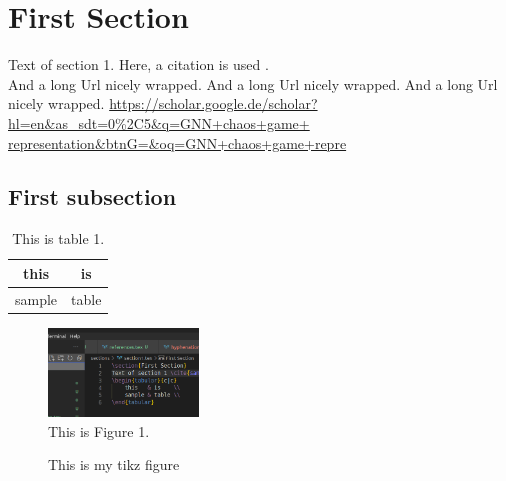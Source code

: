 \section{First Section}

Text of section 1. Here, a citation is used \cite{sample, onlineRef}.\\
And a long Url nicely wrapped. And a long Url nicely wrapped. And a long Url nicely wrapped.
\url{https://scholar.google.de/scholar?hl=en&as_sdt=0\%2C5&q=GNN+chaos+game+
representation&btnG=&oq=GNN+chaos+game+repre}

\subsection{First subsection}

\begin{table}
    \center
    \begin{tabular}{c|c}
        this   & is    \\\hline
        sample & table \\
    \end{tabular}
    \caption{This is table 1.}
\end{table}

\begin{figure}
    \center
    \includegraphics[width=4cm]{fig/images/figure_01.png}
    \caption{This is Figure 1.}
\end{figure}

\begin{figure}
    \center
    
    \caption{This is my tikz figure}
\end{figure}

\newpage